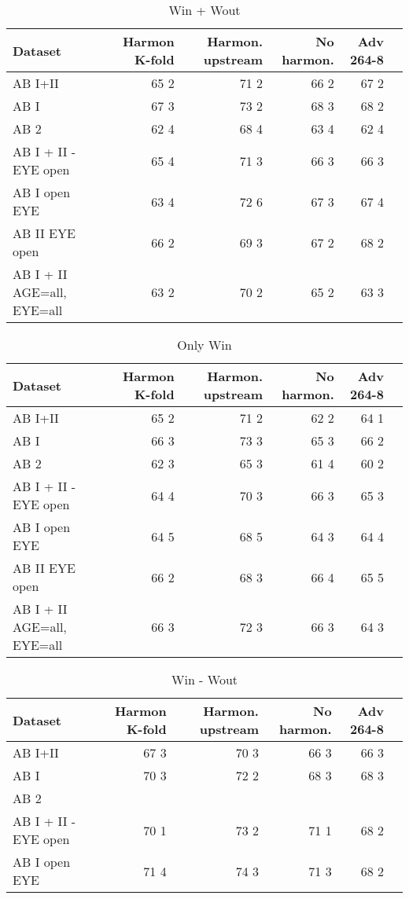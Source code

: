 \documentclass[a4paper,11pt]{article}
\begin{document}
\begin{table}[!htp]\centering
\caption{Win + Wout}\label{}
\scriptsize
\begin{tabular}{lrrrrr}\toprule
Dataset &Harmon K-fold &Harmon. upstream &No harmon. &Adv 264-8 \\\midrule
AB I+II &65 2 &71 2 &66 2 &67 2 \\
AB I &67 3 &73 2 &68 3 &68 2 \\
AB 2 &62 4 &68 4 &63 4 &62 4 \\
AB I + II - EYE open &65 4 &71 3 &66 3 &66 3 \\
AB I open EYE &63 4 &72 6 &67 3 &67 4 \\
AB II EYE open &66 2 &69 3 &67 2 &68 2 \\
AB I + II AGE=all, EYE=all &63 2 &70 2 &65 2 &63 3 \\
\bottomrule
\end{tabular}
\end{table}

\begin{table}[!htp]\centering
\caption{Only Win}\label{}
\scriptsize
\begin{tabular}{lrrrrr}\toprule
Dataset &Harmon K-fold &Harmon. upstream &No harmon. &Adv 264-8 \\\midrule
AB I+II &65 2 &71 2 &62 2 &64 1 \\
AB I &66 3 &73 3 &65 3 &66 2 \\
AB 2 &62 3 &65 3 &61 4 &60 2 \\
AB I + II - EYE open &64 4 &70 3 &66 3 &65 3 \\
AB I open EYE &64 5 &68 5 &64 3 &64 4 \\
AB II EYE open &66 2 &68 3 &66 4 &65 5 \\
AB I + II AGE=all, EYE=all &66 3 &72 3 &66 3 &64 3 \\
\bottomrule
\end{tabular}
\end{table}

\begin{table}[!htp]\centering
\begin{tabular}{lrrrrr}\toprule
Dataset &Harmon K-fold &Harmon. upstream &No harmon. &Adv 264-8 \\\midrule
AB I+II &67 3 &70 3 &66 3 &66 3 \\
AB I &70 3 &72 2 &68 3 &68 3 \\
AB 2 & & & & \\
AB I + II - EYE open &70 1 &73 2 &71 1 &68 2 \\
AB I open EYE &71 4 &74 3 &71 3 &68 2 \\
\bottomrule
\end{tabular}
\caption{Win - Wout}\label{}
\end{table}
\end{document}
